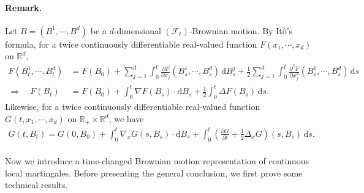 \documentclass{article}
\numberwithin{equation}{section}
\renewcommand{\d}{\mathrm{d}}
\theoremstyle{plain}
\theoremstyle{definition}
\begin{document}
\paragraph{Remark.} Let $B=(B^1,\cdots,B^d)$ be a $d$-dimensional $(\mathscr{F}_t)$-Brownian motion. By Itô's formula, for a twice continuously differentiable real-valued function $F(x_1,\cdots,x_d)$ on $\mathbb{R}^d$,
\begin{align*}
	F(B_t^1,\cdots,B_t^d)&=F(B_0)+\sum_{j=1}^d\int_0^t\frac{\partial F}{\partial x_j}(B_s^1,\cdots,B_s^d)\,\d B_s^j + \frac{1}{2}\sum_{j=1}^d\int_0^t\frac{\partial^2 F}{\partial x_j^2}(B_s^1,\cdots,B_s^d)\,\d s\\
	\Rightarrow\quad F(B_t) &= F(B_0)+\int_0^t \nabla F(B_s)\cdot \d B_s + \frac{1}{2}\int_0^t \Delta F(B_s)\,\d s.
\end{align*}
Likewise, for a twice continuously differentiable real-valued function $G(t,x_1,\cdots,x_d)$ on $\mathbb{R}_+\times\mathbb{R}^d$, we have
\begin{align*}
	G(t,B_t)=G(0,B_0)+\int_0^t\nabla_x G(s,B_s)\cdot \d B_s +  \int_0^t\left(\frac{\partial G}{\partial t} + \frac{1}{2}\Delta_x G\right)(s,B_s)\,\d s.
\end{align*} 

\paragraph{} Now we introduce a time-changed Brownian motion representation of continuous local martingales. Before presenting the general conclusion, we first prove some technical results.
\end{document}
